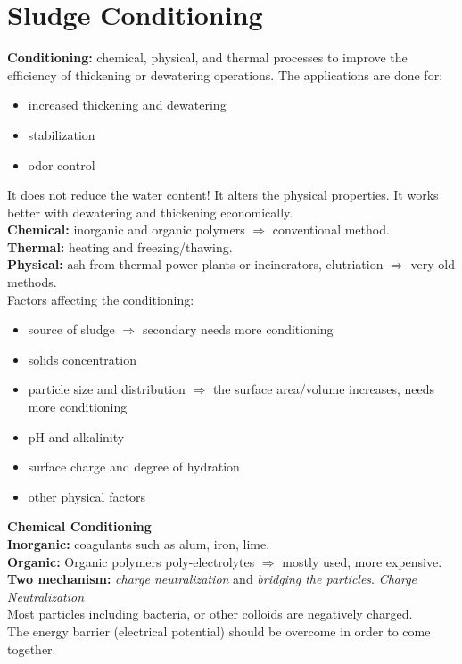 \documentclass{article}
\numberwithin{equation}{section}
\begin{document}
\section{Sludge Conditioning}
\textbf{Conditioning:} chemical, physical, and thermal processes to improve the efficiency of thickening or dewatering operations. The applications are done for:
\begin{itemize}
    \item increased thickening and dewatering
    \item stabilization
    \item odor control
\end{itemize}
It does not reduce the water content! It alters the physical properties. It works better with dewatering and thickening economically.\\
\textbf{Chemical:} inorganic and organic polymers $\Rightarrow$ conventional method.\\
\textbf{Thermal:} heating and freezing/thawing.\\
\textbf{Physical:} ash from thermal power plants or incinerators, elutriation $\Rightarrow$ very old methods.\\
Factors affecting the conditioning:
\begin{itemize}
    \item source of sludge $\Rightarrow$ secondary needs more conditioning
    \item solids concentration
    \item particle size and distribution $\Rightarrow$ the surface area/volume increases, needs more conditioning
    \item pH and alkalinity
    \item surface charge and degree of hydration
    \item other physical factors
\end{itemize}
\textbf{Chemical Conditioning}\\
\textbf{Inorganic:} coagulants such as alum, iron, lime.\\
\textbf{Organic:} Organic polymers poly-electrolytes $\Rightarrow$ mostly used, more expensive.\\
\textbf{Two mechanism:} \emph{charge neutralization} and \emph{bridging the particles}.
\textit{Charge Neutralization}\\
Most particles including bacteria, or other colloids are negatively charged.\\
The energy barrier (electrical potential) should be overcome in order to come together.
\end{document}
